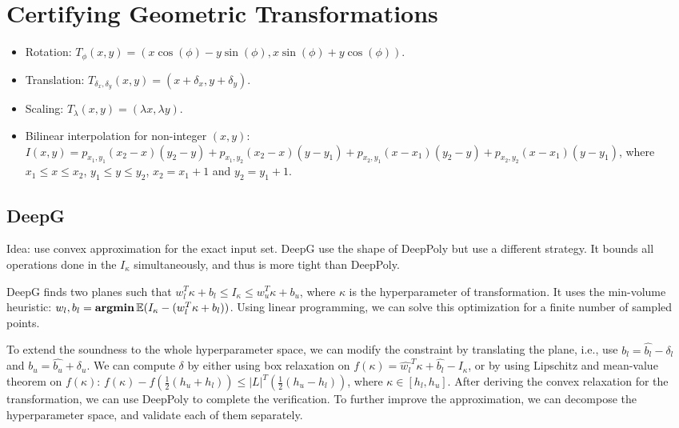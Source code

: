 \section{Certifying Geometric Transformations}

\begin{itemize}
    \item Rotation: $T_\phi(x, y) = (x\cos(\phi)-y\sin(\phi), x\sin(\phi)+y\cos(\phi))$.
    \item Translation: $T_{\delta_x, \delta_y}(x,y) = (x+\delta_x, y+\delta_y)$.
    \item Scaling: $T_\lambda(x,y) = (\lambda x,\lambda y)$.
    \item Bilinear interpolation for non-integer $(x,y)$: $I(x, y)=p_{x_{1}, y_{1}}\left(x_{2}-x\right)\left(y_{2}-y\right)+p_{x_{1}, y_{2}}\left(x_{2}-x\right)\left(y-y_{1}\right)+p_{x_{2}, y_{1}}\left(x-x_{1}\right)\left(y_{2}-y\right)+p_{x_{2}, y_{2}}\left(x-x_{1}\right)\left(y-y_{1}\right)$, where $x_1\le x\le x_2$, $y_1\le y\le y_2$, $x_2=x_1+1$ and $y_2=y_1+1$.
\end{itemize}

\subsection*{DeepG}

Idea: use convex approximation for the exact input set. DeepG use the shape of DeepPoly but use a different strategy. It bounds all operations done in the $I_\kappa$ simultaneously, and thus is more tight than DeepPoly.

DeepG finds two planes such that $w_l^T \kappa+b_l \le I_\kappa \le w_u^T\kappa+b_u$, where $\kappa$ is the hyperparameter of transformation. It uses the min-volume heuristic: $w_l, b_l = \operatorname{\textbf{argmin}} \mathbb{E} (I_\kappa - (w_l^T \kappa+b_l))$. Using linear programming, we can solve this optimization for a finite number of sampled points.

To extend the soundness to the whole hyperparameter space, we can modify the constraint by translating the plane, i.e., use $b_l = \hat{b_l}-\delta_l$ and $b_u = \hat{b_u}+\delta_u$. We can compute $\delta$ by either using box relaxation on $f(\kappa)=\hat{w_l}^T\kappa+\hat{b_l}-I_\kappa$, or by using Lipschitz and mean-value theorem on $f(\kappa)$: $f(\kappa)-f(\frac{1}{2}(h_u+h_l))\le |L|^T(\frac{1}{2}(h_u-h_l))$, where $\kappa \in [h_l, h_u]$. After deriving the convex relaxation for the transformation, we can use DeepPoly to complete the verification. To further improve the approximation, we can decompose the hyperparameter space, and validate each of them separately.